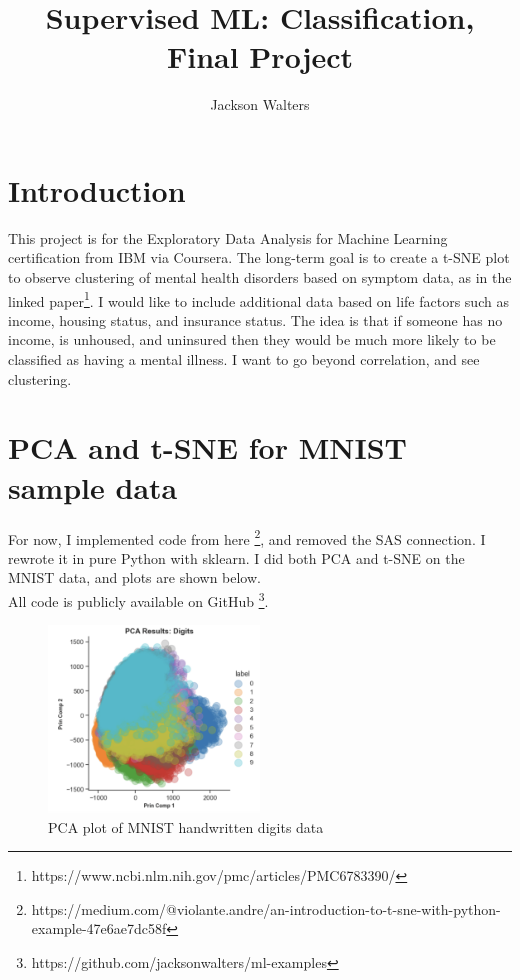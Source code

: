 \documentclass[11pt]{amsart}
\title{Supervised ML: Classification, Final Project}
\author{Jackson Walters}
\date{}                                           %
\begin{document}
\maketitle

\section{Introduction}

This project is for the Exploratory Data Analysis for Machine Learning certification from IBM via Coursera. The long-term goal is to create a t-SNE plot to observe clustering of mental health disorders based on symptom data, as in the linked paper\footnote{https://www.ncbi.nlm.nih.gov/pmc/articles/PMC6783390/}. I would like to include additional data based on life factors such as income, housing status, and insurance status. The idea is that if someone has no income, is unhoused, and uninsured then they would be much more likely to be classified as having a mental illness. I want to go beyond correlation, and see clustering. \\


\section{PCA and t-SNE for MNIST sample data}

For now, I implemented code from here \footnote{https://medium.com/@violante.andre/an-introduction-to-t-sne-with-python-example-47e6ae7dc58f}, and removed the SAS connection. I rewrote it in pure Python with sklearn. I did both PCA and t-SNE on the MNIST data, and plots are shown below. \\

All code is publicly available on GitHub \footnote{https://github.com/jacksonwalters/ml-examples}.

\begin{figure}[h]
\caption{PCA plot of MNIST handwritten digits data}
\centering
\includegraphics[width=0.5\textwidth]{PCA_plot_MNIST}
\end{figure}
\end{document}
